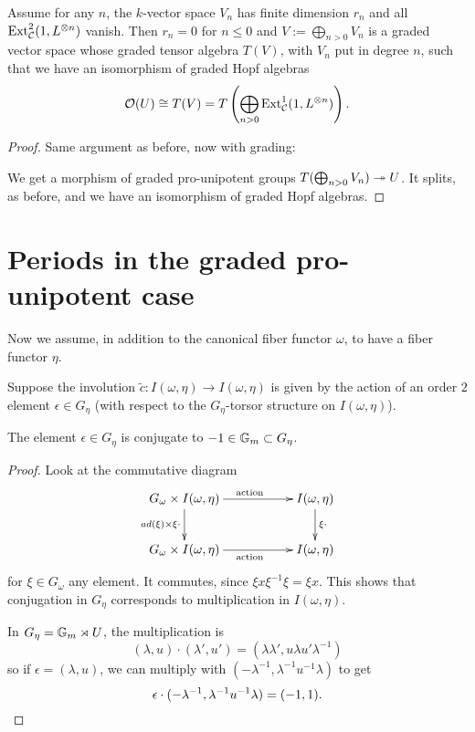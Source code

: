 \begin{prop}
 Assume for any $n$, the $k$-vector space $V_n$ has finite dimension $r_n$ and all $\mathrm{Ext}^2_ {\mathcal{C}}(1,L^{\otimes n})$ vanish. Then $r_n = 0$ for $n \leq 0$ and $V := \bigoplus_{n > 0} V_n$ is a graded vector space whose graded tensor algebra $T(V)$, with $V_n$ put in degree $n$, such that we have an isomorphism of graded Hopf algebras
\[\mathcal{O}(U) \cong T(V) = T\left(\bigoplus_{n>0} \mathrm{Ext}^1_{\mathcal{C}}(1,L^{\otimes n})\right).\]
\end{prop}
\begin{proof}
 Same argument as before, now with grading:

We get a morphism of graded pro-unipotent groups $T(\bigoplus_{n > 0} V_n) \twoheadrightarrow U$.
It splits, as before, and we have an isomorphism of graded Hopf algebras.
\end{proof}















\section{Periods in the graded pro-unipotent case}

Now we assume, in addition to the canonical fiber functor $\omega$, to have a fiber functor $\eta$.

Suppose the involution $\tilde{c} : I(\omega,\eta) \to I(\omega,\eta)$ is given by the action of an order $2$ element $\epsilon \in G_\eta$ (with respect to the $G_\eta$-torsor structure on $I(\omega,\eta)$).

\begin{lemma}
 The element $\epsilon \in G_\eta$ is conjugate to $-1 \in \mathbb{G}_m \subset G_\eta$.
\end{lemma}
\begin{proof}
 Look at the commutative diagram
\[
\xymatrix{
G_{\omega} \times I(\omega, \eta) \ar[d]_{ad(\xi) \times \xi \cdot} \ar[rr]^{\mathrm{action}} && I(\omega, \eta) \ar[d]^{\xi \cdot} \\
G_{\omega} \times I(\omega, \eta) \ar[rr]_{\mathrm{action}} && I(\omega, \eta)
}
\]
for $\xi \in G_\omega$ any element. It commutes, since $\xi x \xi^{-1} \xi = \xi x$.
This shows that conjugation in $G_\eta$ corresponds to multiplication in $I(\omega,\eta)$.

In $G_\eta = \mathbb{G}_m \rtimes U$, the multiplication is
\[(\lambda,u) \cdot (\lambda',u') = (\lambda \lambda', u \lambda u' \lambda^{-1})\]
so if $\epsilon = (\lambda,u)$, we can multiply with $(-\lambda^{-1},\lambda^{-1} u^{-1} \lambda)$ to get
\[\epsilon \cdot (-\lambda^{-1},\lambda^{-1} u^{-1} \lambda) = (-1, 1). \qedhere\]
\end{proof}



